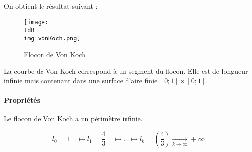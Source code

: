 
			On obtient le résultat suivant : 

			\begin{figure}[H]
				\centering
				\texttt{[image: \\tdB\\img vonKoch.png]}
				\caption{Flocon de Von Koch}
				\label{img-2-vonKoch}
			\end{figure}

			La courbe de Von Koch correspond à un segment du flocon.
			Elle est de longueur infinie mais contenant dans une surface d'aire finie $[0;1]\times[0;1]$.


		\paragraph{Propriétés}
	    
			\begin{propShort}
				Le flocon de Von Koch a un périmètre infinie.
			\end{propShort}
			\begin{preuve}
			$$
				l_0 = 1 \quad \mapsto l_1 = \frac{4}{3} \quad \mapsto \ldots \mapsto l_k = \left(\frac{4}{3}\right) \underset{k\to\infty}{\to} + \infty
			$$
			\end{preuve}


